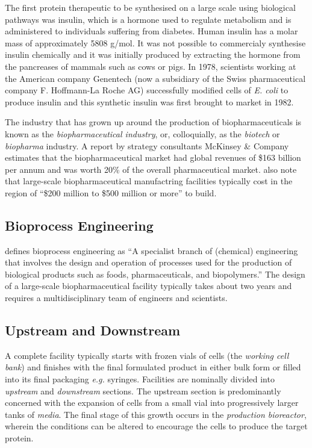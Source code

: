 The first protein therapeutic to be synthesised on a large scale using 
biological pathways was insulin, which is a hormone used to regulate metabolism
and is administered to individuals suffering from diabetes.  Human insulin has a
molar mass of approximately 5808 g/mol.  It was not possible to commercialy
synthesise insulin chemically and it was initially produced by extracting the
hormone from the pancreases of mammals such as cows or pigs.  In 1978, 
scientists working at  the American company Genentech (now a subsidiary of the
Swiss pharmaceutical company F. Hoffmann-La Roche AG) successfully modified 
cells of \textit{E. coli} to produce insulin and this synthetic insulin was
first brought to market in 1982.

The industry that has grown up around the production of biopharmaceuticals is 
known as the \emph{biopharmaceutical industry}, or, colloquially, as the
\emph{biotech} or \emph{biopharma} industry.  A report by strategy consultants
McKinsey \& Company \citep{Otto:2014} estimates that the biopharmaceutical 
market had global revenues of \$163 billion per annum and was worth 20\% of the
overall pharmaceutical market.  \citet{Otto:2014} also note that large-scale
biopharmaceutical manufactring facilities typically cost in the region of
``\$200 million to \$500 million or more'' to build.

\subsection{Bioprocess Engineering}\label{SS.bioproceng}

\citet{Schaschke:2014} defines bioprocess engineering as ``A specialist branch
of (chemical) engineering that involves the design and operation of processes
used for the production of biological products such as foods, pharmaceuticals,
and biopolymers.''  The design of a large-scale biopharmaceutical facility
typically takes about two years and requires a multidisciplinary team of
engineers and scientists.

\subsection{Upstream and Downstream}\label{SS.updown}

A complete facility typically starts with frozen vials of cells (the 
\emph{working cell bank}) and finishes with the final formulated product in
either bulk form or filled into its final packaging \textit{e.g.} syringes.
Facilities are nominally divided into \emph{upstream} and \emph{downstream} 
sections.
The upstream section is predominantly concerned with the expansion of cells
from a small vial into progressively larger tanks of \emph{media}.  
The final stage of this growth occurs in the \emph{production bioreactor}, 
wherein the conditions can be altered to encourage the cells to produce the 
target protein.

